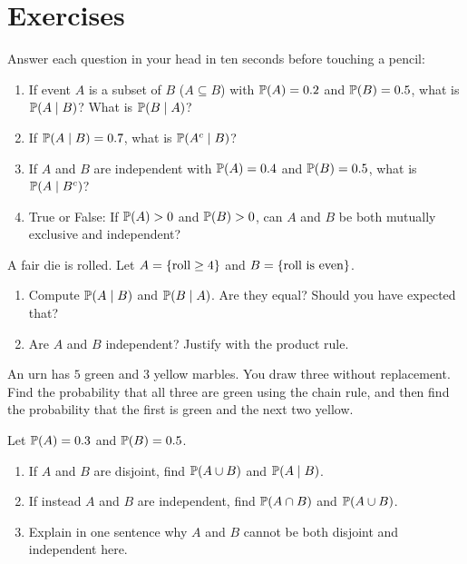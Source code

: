 \section{Exercises}
\label{ch04:exercises}

\begin{exercise}
\label{ch04:exer-mental}
Answer each question in your head in ten seconds before touching a pencil:
\begin{enumerate}
\item If event $A$ is a subset of $B$ ($A \subseteq B$) with $\P(A) = 0.2$ and $\P(B) = 0.5$, what is $\P(A \given B)$? What is $\P(B \given A)$?
\item If $\P(A \given B) = 0.7$, what is $\P(A^c \given B)$?
\item If $A$ and $B$ are independent with $\P(A) = 0.4$ and $\P(B) = 0.5$, what is $\P(A \given B^c)$?
\item True or False: If $\P(A) > 0$ and $\P(B) > 0$, can $A$ and $B$ be both mutually exclusive and independent?
\end{enumerate}
\end{exercise}

\begin{exercise}
\label{ch04:exer-warmup}
A fair die is rolled. Let $A = \set{\text{roll} \ge 4}$ and $B = \set{\text{roll is even}}$.
\begin{enumerate}
\item Compute $\P(A\given B)$ and $\P(B\given A)$. Are they equal? Should you have expected that?
\item Are $A$ and $B$ independent? Justify with the product rule.
\end{enumerate}
\end{exercise}

\begin{exercise}
\label{ch04:exer-urn}
An urn has $5$ green and $3$ yellow marbles. You draw three without replacement. Find the probability that all three are green using the chain rule, and then find the probability that the first is green and the next two yellow.
\end{exercise}

\begin{exercise}
\label{ch04:exer-disjoint}
Let $\P(A) = 0.3$ and $\P(B) = 0.5$.
\begin{enumerate}
\item If $A$ and $B$ are disjoint, find $\P(A\cup B)$ and $\P(A\given B)$.
\item If instead $A$ and $B$ are independent, find $\P(A\cap B)$ and $\P(A\cup B)$.
\item Explain in one sentence why $A$ and $B$ cannot be both disjoint and independent here.
\end{enumerate}
\end{exercise}

